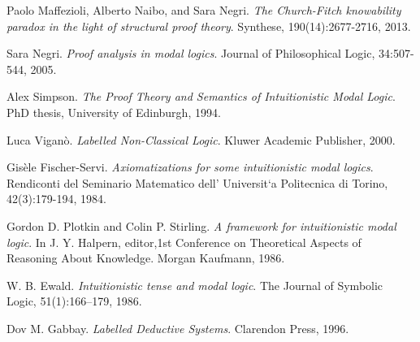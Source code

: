 \documentclass[twoside]{aiml18}
\begin{document}
\begin{thebibliography}{4}
	Paolo Maffezioli, Alberto Naibo, and Sara Negri. \emph{The Church-Fitch knowability paradox in the light of structural proof theory}. Synthese, 190(14):2677-2716, 2013. 
	
	
	Sara Negri. \emph{Proof analysis in modal logics}. Journal of Philosophical Logic, 34:507-544, 2005. 
	
	Alex Simpson. \emph{The Proof Theory and Semantics of Intuitionistic Modal Logic}. PhD thesis, University of Edinburgh, 1994. 
	
	Luca Vigan\`o. \emph{Labelled Non-Classical Logic}. Kluwer Academic Publisher, 2000. 
	
	
	Gis\`ele Fischer-Servi.\emph{ Axiomatizations for some intuitionistic modal logics}. Rendiconti del Seminario Matematico dell’ Universit`a Politecnica di Torino, 42(3):179-194, 1984.
	
	Gordon D. Plotkin and Colin P. Stirling. \emph{A framework for intuitionistic modal logic}. In J. Y. Halpern, editor,1st Conference on Theoretical Aspects of Reasoning About Knowledge.
	Morgan Kaufmann, 1986.
	
	W. B. Ewald. \emph{Intuitionistic tense and modal logic}. The Journal of Symbolic Logic, 51(1):166–179, 1986.
	
	Dov M. Gabbay. \emph{Labelled Deductive Systems}. Clarendon Press, 1996.
	
	
	
\end{thebibliography}
\end{document}
